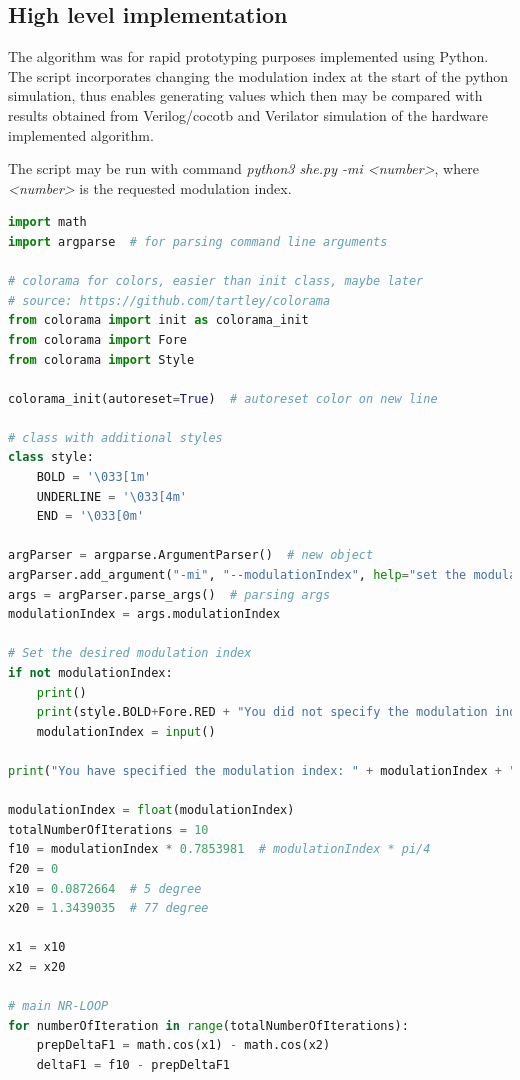 \documentclass[a4paper, twoside, 11pt]{article}
\begin{document}
    \subsection{High level implementation}
    The algorithm was for rapid prototyping purposes implemented using Python. The script incorporates changing the modulation index at the start of the python simulation, thus enables generating values which then may be compared with results obtained from Verilog/cocotb and Verilator simulation of the hardware implemented algorithm.\par
    The script may be run with command \textit{python3 she.py -mi <number>}, where \textit{<number>} is the requested modulation index.
\begin{lstlisting}[language={python}, caption={Python implementation of the Selective Harmonic Elimination Algorithm with adjustable modulation index.}, label= {lst:she-python}]
import math
import argparse  # for parsing command line arguments

# colorama for colors, easier than init class, maybe later
# source: https://github.com/tartley/colorama
from colorama import init as colorama_init
from colorama import Fore
from colorama import Style

colorama_init(autoreset=True)  # autoreset color on new line

# class with additional styles
class style:
    BOLD = '\033[1m'
    UNDERLINE = '\033[4m'
    END = '\033[0m'

argParser = argparse.ArgumentParser()  # new object
argParser.add_argument("-mi", "--modulationIndex", help="set the modulation index 0-1") # adding argument
args = argParser.parse_args()  # parsing args
modulationIndex = args.modulationIndex

# Set the desired modulation index
if not modulationIndex:
    print()
    print(style.BOLD+Fore.RED + "You did not specify the modulation index with mi command, specify it now:\n" + style.END)
    modulationIndex = input()

print("You have specified the modulation index: " + modulationIndex + ".\n")

modulationIndex = float(modulationIndex)
totalNumberOfIterations = 10
f10 = modulationIndex * 0.7853981  # modulationIndex * pi/4
f20 = 0
x10 = 0.0872664  # 5 degree
x20 = 1.3439035  # 77 degree

x1 = x10
x2 = x20

# main NR-LOOP
for numberOfIteration in range(totalNumberOfIterations):
    prepDeltaF1 = math.cos(x1) - math.cos(x2)
    deltaF1 = f10 - prepDeltaF1


\end{lstlisting}
\end{document}
